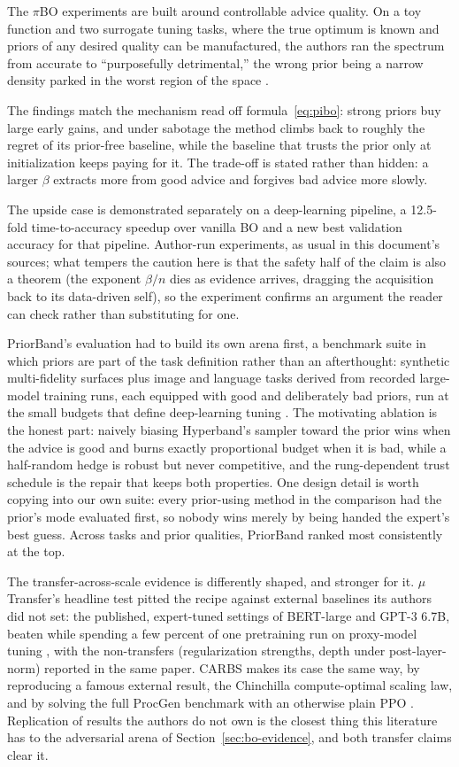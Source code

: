 The $\pi$BO experiments are built around controllable advice quality.
On a toy function and two surrogate tuning tasks, where the true
optimum is known and priors of any desired quality can be
manufactured, the authors ran the spectrum from accurate to
``purposefully detrimental,'' the wrong prior being a narrow density
parked in the worst region of the space \citep{hvarfner2022pibo}.

The findings match the mechanism read off
formula~\eqref{eq:pibo}: strong priors buy large early gains, and
under sabotage the method climbs back to roughly the regret of its
prior-free baseline, while the baseline that trusts the prior only at
initialization keeps paying for it. The trade-off is stated rather
than hidden: a larger $\beta$ extracts more from good advice and
forgives bad advice more slowly.

The upside case is demonstrated
separately on a deep-learning pipeline, a 12.5-fold time-to-accuracy
speedup over vanilla BO and a new best validation accuracy for that
pipeline. Author-run experiments, as usual in this document's
sources; what tempers the caution here is that the safety half of the
claim is also a theorem (the exponent $\beta/n$ dies as evidence
arrives, dragging the acquisition back to its data-driven self), so
the experiment confirms an argument the reader can check rather than
substituting for one.

PriorBand's evaluation had to build its own arena first, a benchmark
suite in which priors are part of the task definition rather than an
afterthought: synthetic multi-fidelity surfaces plus image and
language tasks derived from recorded large-model training runs, each
equipped with good and deliberately bad priors, run at the small
budgets that define deep-learning tuning
\citep{mallik2023priorband}. The motivating ablation is the honest
part: naively biasing Hyperband's sampler toward the prior wins when
the advice is good and burns exactly proportional budget when it is
bad, while a half-random hedge is robust but never competitive, and
the rung-dependent trust schedule is the repair that keeps both
properties. One design detail is worth copying into our own suite:
every prior-using method in the comparison had the prior's mode
evaluated first, so nobody wins merely by being handed the expert's
best guess. Across tasks and prior qualities, PriorBand ranked most
consistently at the top.

The transfer-across-scale evidence is differently shaped, and
stronger for it. $\mu$Transfer's headline test pitted the recipe
against external baselines its authors did not set: the published,
expert-tuned settings of BERT-large and GPT-3 6.7B, beaten while
spending a few percent of one pretraining run on proxy-model tuning
\citep{yang2022mutransfer}, with the non-transfers (regularization
strengths, depth under post-layer-norm) reported in the same paper.
CARBS makes its case the same way, by reproducing a famous external
result, the Chinchilla compute-optimal scaling law, and by solving
the full ProcGen benchmark with an otherwise plain PPO
\citep{fetterman2023carbs}. Replication of results the authors do
not own is the closest thing this literature has to the
adversarial arena of Section~\ref{sec:bo-evidence}, and both
transfer claims clear it.

